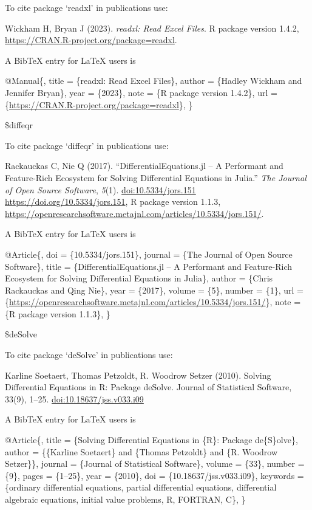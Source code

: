 \documentclass[
]{article}
\begin{document}
To cite package `readxl' in publications use:

Wickham H, Bryan J (2023). \emph{readxl: Read Excel Files}. R package
version 1.4.2, \url{https://CRAN.R-project.org/package=readxl}.

A BibTeX entry for LaTeX users is

@Manual\{, title = \{readxl: Read Excel Files\}, author = \{Hadley
Wickham and Jennifer Bryan\}, year = \{2023\}, note = \{R package
version 1.4.2\}, url =
\{\url{https://CRAN.R-project.org/package=readxl}\}, \}

\$diffeqr

To cite package `diffeqr' in publications use:

Rackauckas C, Nie Q (2017). ``DifferentialEquations.jl -- A Performant
and Feature-Rich Ecosystem for Solving Differential Equations in
Julia.'' \emph{The Journal of Open Source Software}, \emph{5}(1).
\url{doi:10.5334/jors.151} \url{https://doi.org/10.5334/jors.151}, R
package version 1.1.3,
\url{https://openresearchsoftware.metajnl.com/articles/10.5334/jors.151/}.

A BibTeX entry for LaTeX users is

@Article\{, doi = \{10.5334/jors.151\}, journal = \{The Journal of Open
Source Software\}, title = \{DifferentialEquations.jl -- A Performant
and Feature-Rich Ecosystem for Solving Differential Equations in
Julia\}, author = \{Chris Rackauckas and Qing Nie\}, year = \{2017\},
volume = \{5\}, number = \{1\}, url =
\{\url{https://openresearchsoftware.metajnl.com/articles/10.5334/jors.151/}\},
note = \{R package version 1.1.3\}, \}

\$deSolve

To cite package `deSolve' in publications use:

Karline Soetaert, Thomas Petzoldt, R. Woodrow Setzer (2010). Solving
Differential Equations in R: Package deSolve. Journal of Statistical
Software, 33(9), 1--25. \url{doi:10.18637/jss.v033.i09}

A BibTeX entry for LaTeX users is

@Article\{, title = \{Solving Differential Equations in \{R\}: Package
de\{S\}olve\}, author = \{\{Karline Soetaert\} and \{Thomas Petzoldt\}
and \{R. Woodrow Setzer\}\}, journal = \{Journal of Statistical
Software\}, volume = \{33\}, number = \{9\}, pages = \{1--25\}, year =
\{2010\}, doi = \{10.18637/jss.v033.i09\}, keywords = \{ordinary
differential equations, partial differential equations, differential
algebraic equations, initial value problems, R, FORTRAN, C\}, \}
\end{document}
